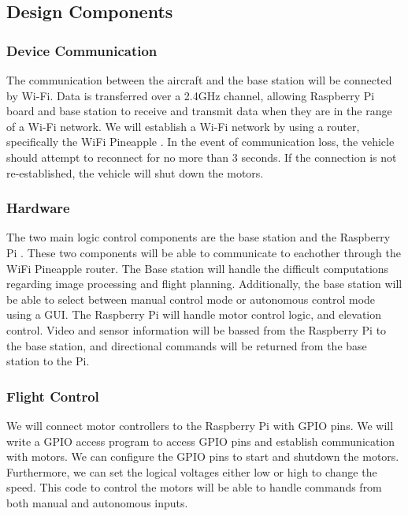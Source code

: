 \documentclass[onecolumn, draftclsnofoot,10pt, compsoc]{IEEEtran}
\begin{document}
\subsection{Design Components}

\subsubsection{Device Communication} 

The communication between the aircraft and the base station will be connected by Wi-Fi. Data is transferred over a 2.4GHz channel, allowing Raspberry Pi board and base station to receive and transmit data when they are in the range of a Wi-Fi network. We will establish a Wi-Fi network by using a router, specifically the WiFi Pineapple \cite{r12}. In the event of communication loss, the vehicle should attempt to reconnect for no more than 3 seconds. If the connection is not re-established, the vehicle will shut down the motors. 


\subsubsection{Hardware}

The two main logic control components are the base station and the Raspberry Pi \cite{r3}. These two components will be able to communicate to eachother through the WiFi Pineapple router. The Base station will handle the difficult computations regarding image processing and flight planning. Additionally, the base station will be able to select between manual control mode or autonomous control mode using a GUI. The Raspberry Pi will handle motor control logic, and elevation control. Video and sensor information will be bassed from the Raspberry Pi to the base station, and directional commands will be returned from the base station to the Pi. 


\subsubsection{Flight Control}

We will connect motor controllers to the Raspberry Pi with GPIO pins. We will write a GPIO access program to access GPIO pins and establish communication with motors. We can configure the GPIO pins to start and shutdown the motors. Furthermore, we can set the logical voltages either low or high to change the speed. This code to control the motors will be able to handle commands from both manual and autonomous inputs.
\end{document}

